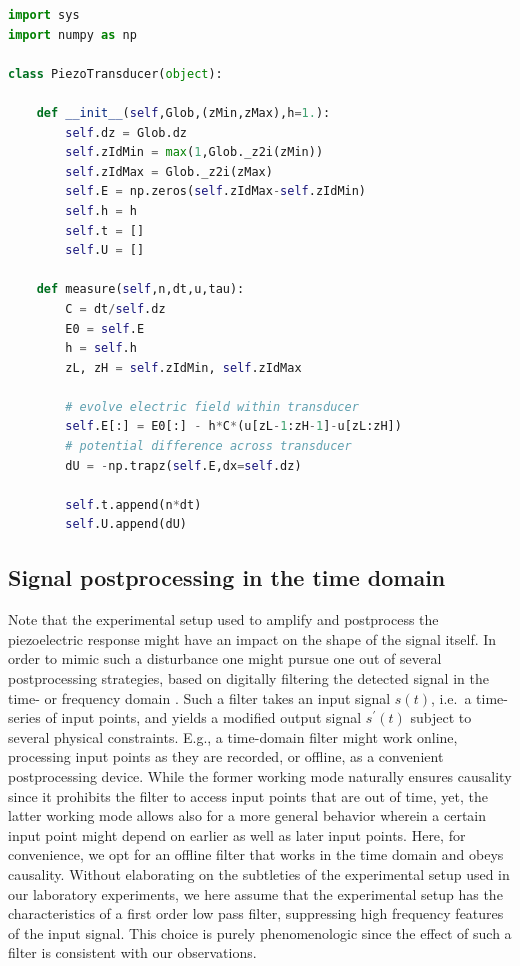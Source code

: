 \documentclass[5p,times,twocolumn]{elsarticle}
\begin{document}
\begin{lstlisting}[float,captionpos=b, keywordstyle=\bf, frame=lines, language=Python,basicstyle=\ttfamily\scriptsize, 
caption={Implementation of a
piezoelectric transducer as piezoelectric sensing layer, contained in {\tt{python}}
module file {\tt{detector.py}}.}, label=code:transducer]
import sys
import numpy as np

class PiezoTransducer(object):

    def __init__(self,Glob,(zMin,zMax),h=1.):
        self.dz = Glob.dz
        self.zIdMin = max(1,Glob._z2i(zMin))
        self.zIdMax = Glob._z2i(zMax)
        self.E = np.zeros(self.zIdMax-self.zIdMin)
        self.h = h
        self.t = []
        self.U = []

    def measure(self,n,dt,u,tau):
        C = dt/self.dz
        E0 = self.E 
        h = self.h
        zL, zH = self.zIdMin, self.zIdMax

        # evolve electric field within transducer
        self.E[:] = E0[:] - h*C*(u[zL-1:zH-1]-u[zL:zH])
        # potential difference across transducer 
        dU = -np.trapz(self.E,dx=self.dz)

        self.t.append(n*dt)
        self.U.append(dU)

\end{lstlisting}


\subsection{Signal postprocessing in the time domain}
\label{ssect:filter}

Note that the experimental setup used to amplify and postprocess the  
piezoelectric response might have an impact on the shape of the signal itself.  In
order to mimic such a disturbance one might pursue one out of several
postprocessing strategies, based on digitally filtering the detected signal in
the time- or frequency domain \cite{NumRec:1992}.  Such a filter takes an input
signal $s(t)$, i.e.\ a time-series of input points, and yields a modified
output signal $s^\prime(t)$ subject to several physical constraints.  E.g., a
time-domain filter might work online, processing input points as they are
recorded, or offline, as a convenient postprocessing device.  While the former
working mode naturally ensures causality since it prohibits the filter to
access input points that are out of time, yet, the latter working mode allows
also for a more general behavior wherein a certain input point might depend on
earlier as well as later input points. Here, for convenience, we opt for an
offline filter that works in the time domain and obeys causality.  Without
elaborating on the subtleties of the experimental setup used in our laboratory
experiments, we here assume that the experimental setup has the characteristics
of a first order low pass filter, suppressing high frequency features of the
input signal. This choice is purely phenomenologic since the effect of such a
filter is consistent with our observations.
\end{document}

